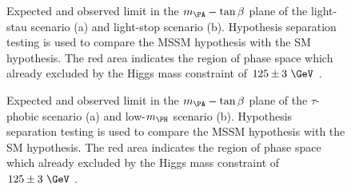 \begin{figure}[tbh]
\caption{Expected and observed limit in the $m_{\PA}-\tan\beta$ plane of the
light-stau scenario (a) and light-stop scenario (b). Hypothesis
separation testing is used to compare the \ac{MSSM} hypothesis with the \ac{SM}
hypothesis. The red area indicates the region of phase space which already
excluded by the Higgs mass constraint of $125\pm3~\GeV$ \cite{HIG-13-021}.}
\label{fig:lightstaulightstop}
\end{figure}

\begin{figure}[tbh]
\caption{Expected and observed limit in the $m_{\PA}-\tan\beta$ plane of the
$\tau$-phobic scenario (a) and low-$m_{\PH}$ scenario (b). Hypothesis
separation testing is used to compare the \ac{MSSM} hypothesis with the \ac{SM}
hypothesis. The red area indicates the region of phase space which already
excluded by the Higgs mass constraint of $125\pm3~\GeV$ \cite{HIG-13-021}.}
\label{fig:tauphobiclowmH}
\end{figure}
